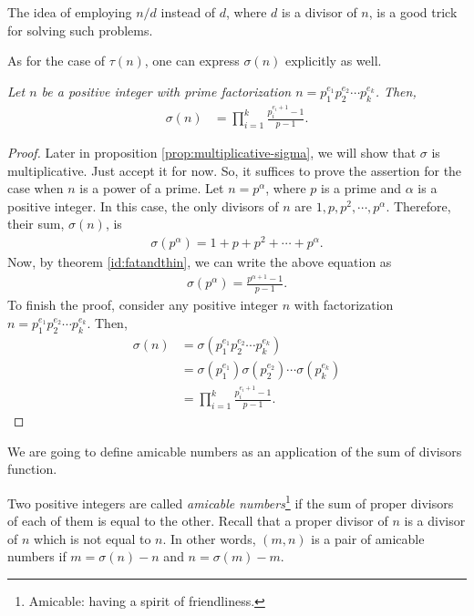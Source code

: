 \documentclass[12pt]{subfile}
\begin{document}
		\begin{note}
			The idea of employing $n/d$ instead of $d$, where $d$ is a divisor of $n$, is a good trick for solving such problems.
		\end{note}

	As for the case of $\tau(n)$, one can express $\sigma(n)$ explicitly as well.

		\begin{theorem}\slshape \label{thm:sigmaformula}
			Let $n$ be a positive integer with prime factorization $n=p_1^{e_1}p_2^{e_2}\cdots p_k^{e_k}$. Then,
			\begin{align*}
			\sigma(n) &= \prod_{i=1}^{k} \frac{p_i^{e_i+1}-1}{p-1}.
			\end{align*}
		\end{theorem}

		\begin{proof}
			Later in proposition \ref{prop:multiplicative-sigma}, we will show that $\sigma$ is multiplicative. Just accept it for now. So, it suffices to prove the assertion for the case when $n$ is a power of a prime. Let $n=p^\alpha$, where $p$ is a prime and $\alpha$ is a positive integer. In this case, the only divisors of $n$ are $1, p, p^2, \cdots, p^\alpha$. Therefore, their sum, $\sigma(n)$, is
				\begin{align*}
					\sigma(p^\alpha) = 1+p+p^2+\cdots+p^\alpha.
				\end{align*}
			Now, by theorem \ref{id:fatandthin}, we can write the above equation as
				\begin{align*}
					\sigma(p^\alpha) = \frac{p^{\alpha+1} - 1}{p-1}.
				\end{align*}
			To finish the proof, consider any positive integer $n$ with factorization $n=p_1^{e_1}p_2^{e_2}\cdots p_k^{e_k}$. Then,
			\begin{align*}
			\sigma(n) &=  \sigma(p_1^{e_1}p_2^{e_2}\cdots p_k^{e_k})\\
			&= \sigma(p_1^{e_1}) \sigma(p_2^{e_2}) \cdots \sigma(p_k^{e_k})\\
			&= \prod_{i=1}^{k} \frac{p_i^{e_i+1}-1}{p-1}.
			\end{align*}
		\end{proof}

	We are going to define amicable numbers as an application of the sum of divisors function.

	\begin{definition}\label{key}
		Two positive integers are called \textit{amicable numbers}\footnote{Amicable: having a spirit of friendliness.} if the sum of proper divisors of each of them is equal to the other. Recall that a proper divisor of $n$ is a divisor of $n$ which is not equal to $n$. In other words, $(m,n)$ is a pair of amicable numbers if $m=\sigma(n)-n$ and $n=\sigma(m)-m$.
	\end{definition}
\end{document}
